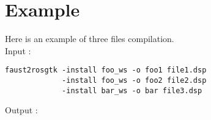 \section{Example}
Here is an example of three files compilation.\\

Input :
\begin{lstlisting}
faust2rosgtk -install foo_ws -o foo1 file1.dsp 
			 -install foo_ws -o foo2 file2.dsp 
			 -install bar_ws -o bar file3.dsp
\end{lstlisting}
\newpage
Output :\\
